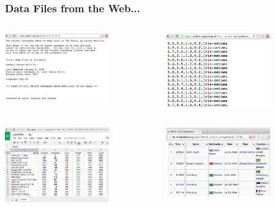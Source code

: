 \documentclass{beamer}\usepackage[]{graphicx}\usepackage[]{color}
\begin{document}
\begin{frame}
\frametitle{Data Files from the Web...}

\begin{columns}[t]
\begin{column}{0.5\textwidth}
 \includegraphics[width=4.5cm]{images/moby_dick_book.png}
\end{column}
\begin{column}{0.5\textwidth}
 \includegraphics[width=4.5cm]{images/iris_data.png}
\end{column}
\end{columns}

\vspace{5mm}

\begin{columns}[t]
\begin{column}{0.5\textwidth}
 \includegraphics[width=4.5cm]{images/cars2004_data.png}
\end{column}
\begin{column}{0.5\textwidth}
 \includegraphics[width=4.5cm]{images/wikipedia_table.png}
\end{column}
\end{columns}

\end{frame}
\end{document}
